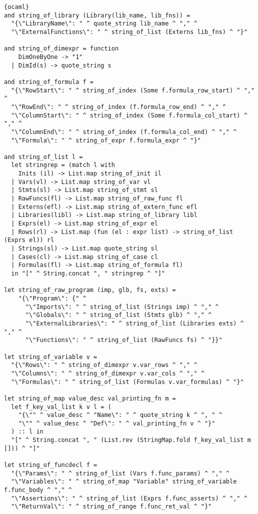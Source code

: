 \begin{lstlisting}{ocaml}
and string_of_library (Library(lib_name, lib_fns)) =
  "{\"LibraryName\": " ^ quote_string lib_name ^ "," ^
  "\"ExternalFunctions\": " ^ string_of_list (Externs lib_fns) ^ "}"

and string_of_dimexpr = function
    DimOneByOne -> "1"
  | DimId(s) -> quote_string s

and string_of_formula f =
  "{\"RowStart\": " ^ string_of_index (Some f.formula_row_start) ^ "," ^
  "\"RowEnd\": " ^ string_of_index (f.formula_row_end) ^ "," ^
  "\"ColumnStart\": " ^ string_of_index (Some f.formula_col_start) ^ "," ^
  "\"ColumnEnd\": " ^ string_of_index (f.formula_col_end) ^ "," ^
  "\"Formula\": " ^ string_of_expr f.formula_expr ^ "}"

and string_of_list l =
  let stringrep = (match l with
    Inits (il) -> List.map string_of_init il
  | Vars(vl) -> List.map string_of_var vl
  | Stmts(sl) -> List.map string_of_stmt sl
  | RawFuncs(fl) -> List.map string_of_raw_func fl
  | Externs(efl) -> List.map string_of_extern_func efl
  | Libraries(libl) -> List.map string_of_library libl
  | Exprs(el) -> List.map string_of_expr el
  | Rows(rl) -> List.map (fun (el : expr list) -> string_of_list (Exprs el)) rl
  | Strings(sl) -> List.map quote_string sl
  | Cases(cl) -> List.map string_of_case cl
  | Formulas(fl) -> List.map string_of_formula fl)
  in "[" ^ String.concat ", " stringrep ^ "]"

let string_of_raw_program (imp, glb, fs, exts) =
    "{\"Program\": {" ^
      "\"Imports\": " ^ string_of_list (Strings imp) ^ "," ^
      "\"Globals\": " ^ string_of_list (Stmts glb) ^ "," ^
      "\"ExternalLibraries\": " ^ string_of_list (Libraries exts) ^ "," ^
      "\"Functions\": " ^ string_of_list (RawFuncs fs) ^ "}}"

let string_of_variable v =
  "{\"Rows\": " ^ string_of_dimexpr v.var_rows ^ "," ^
  "\"Columns\": " ^ string_of_dimexpr v.var_cols ^ "," ^
  "\"Formulas\": " ^ string_of_list (Formulas v.var_formulas) ^ "}"

let string_of_map value_desc val_printing_fn m =
  let f_key_val_list k v l = (
    "{\"" ^ value_desc ^ "Name\": " ^ quote_string k ^ ", " ^
    "\"" ^ value_desc ^ "Def\": " ^ val_printing_fn v ^ "}"
  ) :: l in
  "[" ^ String.concat ", " (List.rev (StringMap.fold f_key_val_list m [])) ^ "]"

let string_of_funcdecl f =
  "{\"Params\": " ^ string_of_list (Vars f.func_params) ^ "," ^
  "\"Variables\": " ^ string_of_map "Variable" string_of_variable f.func_body ^ "," ^
  "\"Assertions\": " ^ string_of_list (Exprs f.func_asserts) ^ "," ^
  "\"ReturnVal\": " ^ string_of_range f.func_ret_val ^ "}"


\end{lstlisting}
